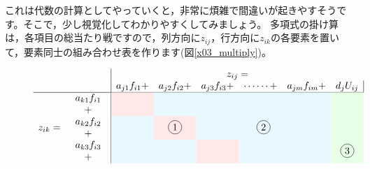 \documentclass{ltjsbook}
\begin{document}
これは代数の計算としてやっていくと，非常に煩雑で間違いが起きやすそうです。そこで，少し視覚化してわかりやすくしてみましょう。
多項式の掛け算は，各項目の総当たり戦ですので，列方向に$z_{ij}$，行方向に$z_{ik}$の各要素を置いて，要素同士の組み合わせ表を作ります(図\ref{x03_multiply})。

\begin{figure}[ht]
	\[
		\begin{array}{rl|cccccc|}
			        &                                                       & \multicolumn{6}{c}{z_{ij}=}                                                                                                                                                                                                                                        \\
			        &                                                       & a_{j1}f_{i1} +                                          & a_{j2}f_{i2}+                                            & a_{j3}f_{i3} +                                         & \cdots\cdots +                                          & a_{jm}f_{im} + & d_jU_{ij} \\\hline
			        & \begin{array}{c}a_{k1}f_{i1}\\+\end{array}            & \multicolumn{1}{>{\columncolor{red!9}}c}{}              & \multicolumn{4}{>{\columncolor{cyan!9}}c}{}              & \multicolumn{1}{>{\columncolor{green!9}}c}{}                                                                                                  \\
			z_{ik}= & \begin{array}{c}a_{k2}f_{i2}\\+\end{array}            & \multicolumn{1}{>{\columncolor{cyan!9}}c}{}             & \multicolumn{1}{>{\columncolor{red!9}}c}{\circled{1}}    & \multicolumn{3}{>{\columncolor{cyan!9}}c}{\circled{2}} & \multicolumn{1}{>{\columncolor{green!9}}c}{}                                         \\
			        & \begin{array}{c}a_{k3}f_{i3}\\+\end{array}            & \multicolumn{2}{>{\columncolor{cyan!9}}c}{}             & \multicolumn{1}{>{\columncolor{red!9}}c}{}               & \multicolumn{2}{>{\columncolor{cyan!9}}c}{}            & \multicolumn{1}{>{\columncolor{green!9}}c}{\circled{3}}                              \\

\end{array}\]
\end{figure}
\end{document}
